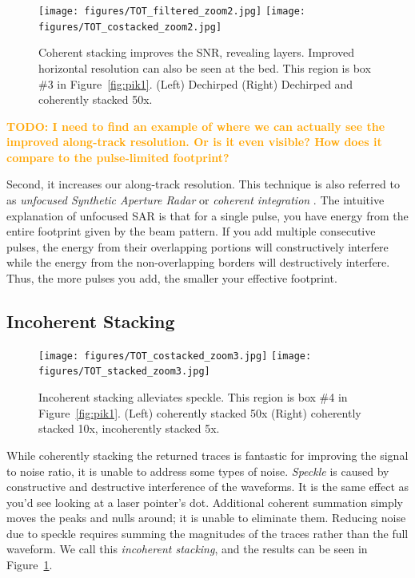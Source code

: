 \documentclass[11pt]{article}
\newcommand{\future}[1]{\ifthenelse{\boolean{include-future}} {\textcolor{Orange}{\textbf{TODO: #1}}}{}}
\newcommand{\figref}[1]{Figure~\ref{#1}}
\begin{document}
\begin{figure}[ht!]
\centering
\texttt{[image: figures/TOT\_filtered\_zoom2.jpg]}
\texttt{[image: figures/TOT\_costacked\_zoom2.jpg]}
\caption[]{Coherent stacking improves the SNR, revealing layers. Improved horizontal resolution can also be seen at the bed. This region is box \#3 in \figref{fig:pik1}. (Left) Dechirped (Right) Dechirped and coherently stacked 50x.}
\end{figure}

\future{I need to find an example of where we can actually see the improved along-track resolution. Or is it even visible? How does it compare to the pulse-limited footprint?}

Second, it increases our along-track resolution. This technique is also referred to as \emph{unfocused Synthetic Aperture Radar} or \emph{coherent integration} \cite{Peters2005}.
The intuitive explanation of unfocused SAR is that for a single pulse, you have energy from the entire footprint given by the beam pattern. 
If you add multiple consecutive pulses, the energy from their overlapping portions will constructively interfere while the energy from the non-overlapping borders will destructively interfere. 
Thus, the more pulses you add, the smaller your effective footprint. 

\subsection{Incoherent Stacking}

\begin{figure}[ht!]
\centering
\texttt{[image: figures/TOT\_costacked\_zoom3.jpg]}
\texttt{[image: figures/TOT\_stacked\_zoom3.jpg]}
\caption[]{Incoherent stacking alleviates speckle. This region is box \#4 in \figref{fig:pik1}. (Left) coherently stacked 50x (Right) coherently stacked 10x, incoherently stacked 5x.}
\label{fig:incoherent_stacking}
\end{figure}

While coherently stacking the returned traces is fantastic for improving the signal to noise ratio, it is unable to address some types of noise.
\emph{Speckle} is caused by constructive and destructive interference of the waveforms. It is the same effect as you'd see looking at a laser pointer's dot. Additional coherent summation simply moves the peaks and nulls around; it is unable to eliminate them. Reducing noise due to speckle requires summing the magnitudes of the traces rather than the full waveform. We call this \emph{incoherent stacking}, and the results can be seen in \figref{fig:incoherent_stacking}.
\end{document}
